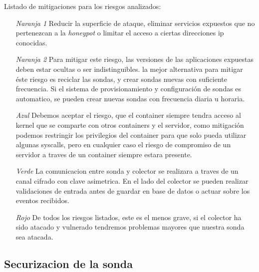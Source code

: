 Listado de mitigaciones para los riesgos analizados:
\begin{enumerate}
    \item[\emph{Naranja 1}] Reducir la superficie de ataque, eliminar servicios expuestos que no pertenezcan a la \emph{honeypot} o limitar el acceso a ciertas direcciones ip conocidas.
    \item[\emph{Naranja 2}] Para mitigar este riesgo, las versiones de las aplicaciones expuestas deben estar ocultas o ser indistinguibles. la mejor alternativa para mitigar éste riesgo es reciclar las sondas, y crear sondas nuevas con suficiente frecuencia. Si el sistema de provisionamiento y configuración de sondas es automatico, se pueden crear nuevas sondas con frecuencia diaria u horaria.
    \item[\emph{Azul}] Debemos aceptar el riesgo, que el container siempre tendra acceso al kernel que se comparte con otros containers y el servidor, como mitigación podemos restringir los privilegios del container para que solo pueda utilizar algunas syscalls, pero en cualquier caso el riesgo de compromiso de un servidor a traves de un container siempre estara presente. 
    \item[\emph{Verde}] La comunicacion entre sonda y colector se realizara a traves de un canal cifrado con clave asimetrica. En el lado del colector se pueden realizar validaciones de entrada antes de guardar en base de datos o actuar sobre los eventos recibidos.
    \item[\emph{Rojo}] De todos los riesgos listados, este es el menos grave, si el colector ha sido atacado y vulnerado tendremos problemas mayores que nuestra sonda sea atacada.
\end{enumerate}

\subsection{Securizacion de la sonda}




